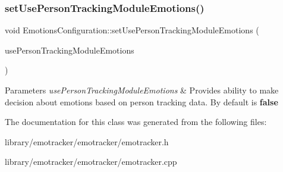 \subsubsection{\texorpdfstring{set\+Use\+Person\+Tracking\+Module\+Emotions()}{setUsePersonTrackingModuleEmotions()}}
{\footnotesize\ttfamily void Emotions\+Configuration\+::set\+Use\+Person\+Tracking\+Module\+Emotions (\begin{DoxyParamCaption}\item[{pxc\+Bool}]{use\+Person\+Tracking\+Module\+Emotions }\end{DoxyParamCaption})}


\begin{DoxyParams}{Parameters}
{\em use\+Person\+Tracking\+Module\+Emotions} & Provides ability to make decision about emotions based on person tracking data. By default is {\bfseries false}\\
\hline
\end{DoxyParams}


The documentation for this class was generated from the following files\+:\begin{DoxyCompactItemize}
\item 
library/emotracker/emotracker/emotracker.\+h\item 
library/emotracker/emotracker/emotracker.\+cpp\end{DoxyCompactItemize}
